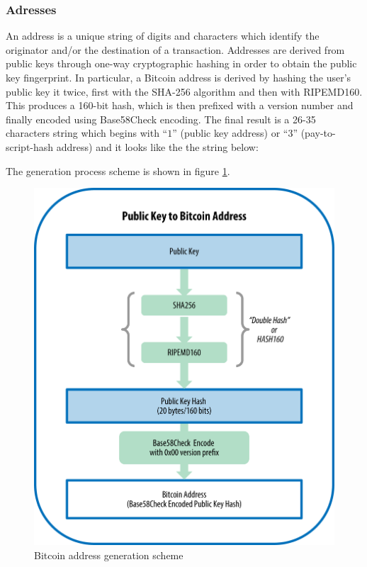 \subsubsection{Adresses} An address is a unique string of digits and characters
which identify the originator and/or the destination of a transaction. Addresses
are derived from public keys through one-way cryptographic hashing in order to
obtain the public key fingerprint. In particular, a Bitcoin address is derived
by hashing the user's public key it twice, first with the SHA-256 algorithm and
then with RIPEMD160. This produces a 160-bit hash, which is then prefixed with a
version number and finally encoded using Base58Check encoding. The final result
is a 26-35 characters string which begins with ``$1$'' (public key address) or
``$3$'' (pay-to-script-hash address) and it looks like the the string below:
\begin{center}  \end{center} The
generation process scheme is shown in figure \ref{fig:address-generation}.

\begin{figure}[!htb]
	\centering
	\includegraphics[width=0.85\linewidth]{img/address-generation.png}
	\caption{Bitcoin address generation scheme}
	\label{fig:address-generation}
\end{figure}

